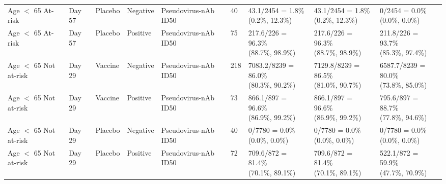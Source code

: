 \documentclass[]{book}
\theoremstyle{definition}
\theoremstyle{definition}
\theoremstyle{definition}
\newcommand{\1}{\mathbbm{1}}
\begin{document}
\begin{landscape}
\begin{ThreePartTable}
\begin{longtable}[t]{>{\raggedright\arraybackslash}p{2.7cm}llllllll}
\hspace{1em}Age $<$ 65 At-risk & Day 57 & Placebo & Negative & Pseudovirus-nAb ID50 & 40 & \makecell[l]{43.1/2454 = 1.8\%\\(0.2\%, 12.3\%)} & \makecell[l]{43.1/2454 = 1.8\%\\(0.2\%, 12.3\%)} & \makecell[l]{0/2454 = 0.0\%\\(0.0\%, 0.0\%)}\\
\hspace{1em}Age $<$ 65 At-risk & Day 57 & Placebo & Positive & Pseudovirus-nAb ID50 & 75 & \makecell[l]{217.6/226 = 96.3\%\\(88.7\%, 98.9\%)} & \makecell[l]{217.6/226 = 96.3\%\\(88.7\%, 98.9\%)} & \makecell[l]{211.8/226 = 93.7\%\\(85.3\%, 97.4\%)}\\
\hspace{1em}Age $<$ 65 Not at-risk & Day 29 & Vaccine & Negative & Pseudovirus-nAb ID50 & 218 & \makecell[l]{7083.2/8239 = 86.0\%\\(80.3\%, 90.2\%)} & \makecell[l]{7129.8/8239 = 86.5\%\\(81.0\%, 90.7\%)} & \makecell[l]{6587.7/8239 = 80.0\%\\(73.8\%, 85.0\%)}\\
\hspace{1em}Age $<$ 65 Not at-risk & Day 29 & Vaccine & Positive & Pseudovirus-nAb ID50 & 73 & \makecell[l]{866.1/897 = 96.6\%\\(86.9\%, 99.2\%)} & \makecell[l]{866.1/897 = 96.6\%\\(86.9\%, 99.2\%)} & \makecell[l]{795.6/897 = 88.7\%\\(77.8\%, 94.6\%)}\\
\hspace{1em}Age $<$ 65 Not at-risk & Day 29 & Placebo & Negative & Pseudovirus-nAb ID50 & 40 & \makecell[l]{0/7780 = 0.0\%\\(0.0\%, 0.0\%)} & \makecell[l]{0/7780 = 0.0\%\\(0.0\%, 0.0\%)} & \makecell[l]{0/7780 = 0.0\%\\(0.0\%, 0.0\%)}\\
\hspace{1em}Age $<$ 65 Not at-risk & Day 29 & Placebo & Positive & Pseudovirus-nAb ID50 & 72 & \makecell[l]{709.6/872 = 81.4\%\\(70.1\%, 89.1\%)} & \makecell[l]{709.6/872 = 81.4\%\\(70.1\%, 89.1\%)} & \makecell[l]{522.1/872 = 59.9\%\\(47.7\%, 70.9\%)}\\

\end{longtable}
\end{ThreePartTable}
\end{landscape}
\end{document}
